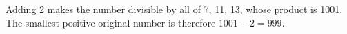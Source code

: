 Adding 2 makes the number divisible by all of 7, 11, 13, whose product is 1001. The smallest positive original number is therefore $1001-2=\boxed{999}$.
